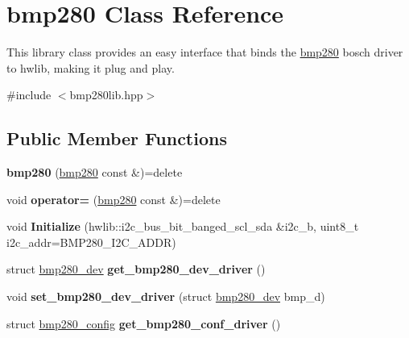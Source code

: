 \hypertarget{classbmp280}{}\section{bmp280 Class Reference}
\label{classbmp280}


This library class provides an easy interface that binds the \mbox{\hyperlink{classbmp280}{bmp280}} bosch driver to hwlib, making it \textquotesingle{}plug and play\textquotesingle{}.  




{\ttfamily \#include $<$bmp280lib.\+hpp$>$}

\subsection*{Public Member Functions}
\begin{DoxyCompactItemize}
\item 
\mbox{\label{classbmp280_a8894efbfc8fd5622ab7872b2546bec5e}} 
{\bfseries bmp280} (\mbox{\hyperlink{classbmp280}{bmp280}} const \&)=delete
\item 
\mbox{\label{classbmp280_a15f44f28857be544ca8628a65f113a5e}} 
void {\bfseries operator=} (\mbox{\hyperlink{classbmp280}{bmp280}} const \&)=delete
\item 
\mbox{\label{classbmp280_ae6908ebdc711f42e5f1c7981c85a728d}} 
void {\bfseries Initialize} (hwlib\+::i2c\+\_\+bus\+\_\+bit\+\_\+banged\+\_\+scl\+\_\+sda \&i2c\+\_\+b, uint8\+\_\+t i2c\+\_\+addr=B\+M\+P280\+\_\+\+I2\+C\+\_\+\+A\+D\+DR)
\item 
\mbox{\label{classbmp280_ac15f0e1c589daaf1778a0f1b86620efb}} 
struct \mbox{\hyperlink{structbmp280__dev}{bmp280\+\_\+dev}} {\bfseries get\+\_\+bmp280\+\_\+dev\+\_\+driver} ()
\item 
\mbox{\label{classbmp280_abf2047614752774902d6897bf0de8c02}} 
void {\bfseries set\+\_\+bmp280\+\_\+dev\+\_\+driver} (struct \mbox{\hyperlink{structbmp280__dev}{bmp280\+\_\+dev}} bmp\+\_\+d)
\item 
\mbox{\label{classbmp280_aa69aa6f655ea7a82e78da96f54aadfb8}} 
struct \mbox{\hyperlink{structbmp280__config}{bmp280\+\_\+config}} {\bfseries get\+\_\+bmp280\+\_\+conf\+\_\+driver} ()

\end{DoxyCompactItemize}
